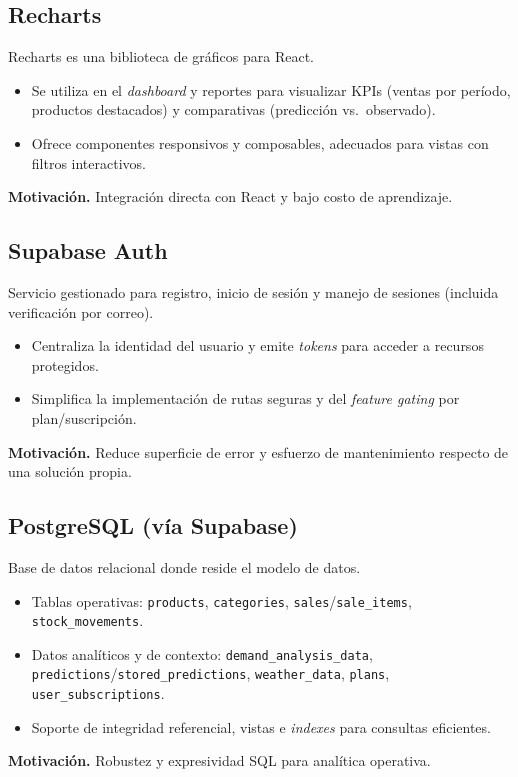 \subsection{Recharts}
Recharts es una biblioteca de gráficos para React.
\begin{itemize}
    \item Se utiliza en el \textit{dashboard} y reportes para visualizar KPIs (ventas por período, productos destacados) y comparativas (predicción vs.\ observado).
    \item Ofrece componentes responsivos y composables, adecuados para vistas con filtros interactivos.
\end{itemize}
\noindent\textbf{Motivación.} Integración directa con React y bajo costo de aprendizaje.

\subsection{Supabase Auth}
Servicio gestionado para registro, inicio de sesión y manejo de sesiones (incluida verificación por correo).
\begin{itemize}
    \item Centraliza la identidad del usuario y emite \textit{tokens} para acceder a recursos protegidos.
    \item Simplifica la implementación de rutas seguras y del \textit{feature gating} por plan/suscripción.
\end{itemize}
\noindent\textbf{Motivación.} Reduce superficie de error y esfuerzo de mantenimiento respecto de una solución propia.

\subsection{PostgreSQL (vía Supabase)}
Base de datos relacional donde reside el modelo de datos.
\begin{itemize}
    \item Tablas operativas: \texttt{products}, \texttt{categories}, \texttt{sales}/\texttt{sale\_items}, \texttt{stock\_movements}.
    \item Datos analíticos y de contexto: \texttt{demand\_analysis\_data}, \texttt{predictions}/\texttt{stored\_predictions}, \texttt{weather\_data}, \texttt{plans}, \texttt{user\_subscriptions}.
    \item Soporte de integridad referencial, vistas e \textit{indexes} para consultas eficientes.
\end{itemize}
\noindent\textbf{Motivación.} Robustez y expresividad SQL para analítica operativa.

